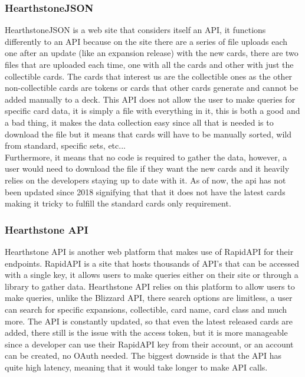 \documentclass{report} %
\begin{document}
\subsubsection{HearthstoneJSON}
HearthstoneJSON is a web site that considers itself an API, it functions differently to an API because on the site there are a series of file uploads each one after an update (like an expansion release) with the new cards, there are two files that are uploaded each time, one with all the cards and other with just the collectible cards. The cards that interest us are the collectible ones as the other non-collectible cards are tokens or cards that other cards generate and cannot be added manually to a deck. This API does not allow the user to make queries for specific card data, it is simply a file with everything in it, this is both a good and a bad thing, it makes the data collection easy since all that is needed is to download the file but it means that cards will have to be manually sorted, wild from standard, specific sets, etc... \\
\indent Furthermore, it means that no code is required to gather the data, however, a user would need to download the file if they want the new cards and it heavily relies on the developers staying up to date with it. As of now, the api has not been updated since 2018 signifying that that it does not have the latest cards making it tricky to fulfill the standard cards only requirement.

\subsubsection{Hearthstone API}
Hearthstone API is another web platform that makes use of RapidAPI for their endpoints. RapidAPI is a site that hosts thousands of API's that can be accessed with a single key, it allows users to make queries either on their site or through a library to gather data. Hearthstone API relies on this platform to allow users to make queries, unlike the Blizzard API, there search options are limitless, a user can search for specific expansions, collectible, card name, card class and much more. The API is constantly updated, so that even the latest released cards are added, there still is the issue with the access token, but it is more manageable  since a developer can use their RapidAPI key from their account, or an account can be created, no OAuth needed. The biggest downside is that the API has quite high latency, meaning that it would take longer to make API calls.
\end{document}
